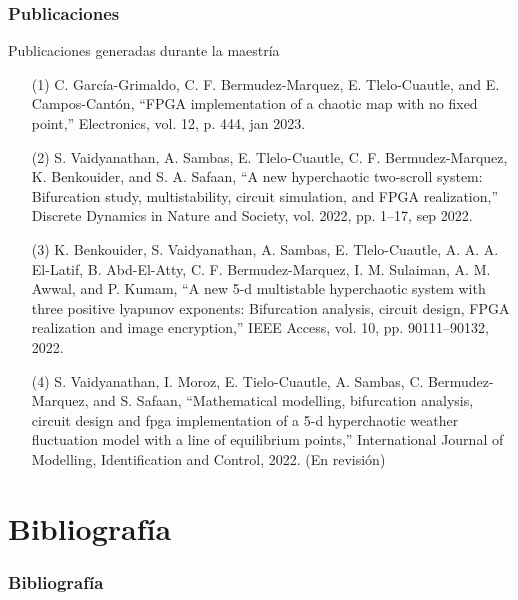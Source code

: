 \documentclass[10pt]{beamer}
\begin{document}
\begin{frame}
    \frametitle{Publicaciones}
    \begin{block}{Publicaciones generadas durante la maestría}
        \justifying
        \begin{scriptsize}
            \begin{enumerate} 
            \item[(1)] C. García-Grimaldo, C. F. Bermudez-Marquez, E. Tlelo-Cuautle, and E. Campos-Cantón, ``FPGA implementation of a chaotic map with no fixed point,'' Electronics, vol. 12, p. 444, jan 2023.

            \item[(2)] S. Vaidyanathan, A. Sambas, E. Tlelo-Cuautle, C. F. Bermudez-Marquez, K. Benkouider, and S. A. Safaan, ``A new hyperchaotic two-scroll system: Bifurcation study, multistability, circuit simulation, and FPGA realization,'' Discrete Dynamics in Nature and Society, vol. 2022, pp. 1–17, sep 2022.

            \item[(3)] K. Benkouider, S. Vaidyanathan, A. Sambas, E. Tlelo-Cuautle, A. A. A. El-Latif, B. Abd-El-Atty, C. F. Bermudez-Marquez, I. M. Sulaiman, A. M. Awwal, and P. Kumam, ``A new 5-d multistable hyperchaotic system with three positive lyapunov exponents: Bifurcation analysis, circuit design, FPGA realization and image encryption,'' IEEE Access, vol. 10, pp. 90111–90132, 2022.

            \item[(4)] S. Vaidyanathan, I. Moroz, E. Tielo-Cuautle, A. Sambas, C. Bermudez-Marquez, and S. Safaan, ``Mathematical modelling, bifurcation analysis, circuit design and fpga implementation of a 5-d hyperchaotic weather fluctuation model with a line of equilibrium points,'' International Journal of Modelling, Identification and Control, 2022. (En revisión)
            \end{enumerate}

        \end{scriptsize}
        
	\end{block}
\end{frame}


\section{Bibliografía}

\begin{frame}[t, allowframebreaks]
    \frametitle{Bibliografía}
	
	
\end{frame}
\end{document}
